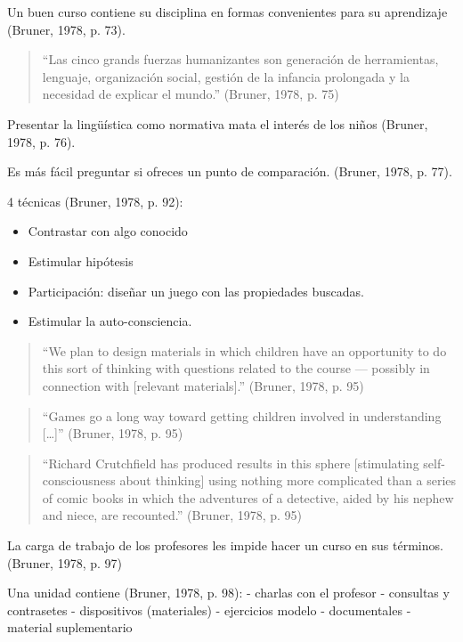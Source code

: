 \documentclass[
  12,
]{scrartcl}
\providecommand{\tightlist}{%
  \setlength{\itemsep}{0pt}\setlength{\parskip}{0pt}}
\begin{document}
Un buen curso contiene su disciplina en formas convenientes para su
aprendizaje (Bruner, 1978, p. 73).

\begin{quote}
``Las cinco grands fuerzas humanizantes son generación de herramientas,
lenguaje, organización social, gestión de la infancia prolongada y la
necesidad de explicar el mundo.'' (Bruner, 1978, p. 75)
\end{quote}

Presentar la lingüística como normativa mata el interés de los niños
(Bruner, 1978, p. 76).

Es más fácil preguntar si ofreces un punto de comparación. (Bruner,
1978, p. 77).

4 técnicas (Bruner, 1978, p. 92):

\begin{itemize}
\tightlist
\item
  Contrastar con algo conocido
\item
  Estimular hipótesis
\item
  Participación: diseñar un juego con las propiedades buscadas.
\item
  Estimular la auto-consciencia.
\end{itemize}

\begin{quote}
``We plan to design materials in which children have an opportunity to
do this sort of thinking with questions related to the course ---
possibly in connection with {[}relevant materials{]}.'' (Bruner, 1978,
p. 95)
\end{quote}

\begin{quote}
``Games go a long way toward getting children involved in understanding
{[}\ldots{]}'' (Bruner, 1978, p. 95)
\end{quote}

\begin{quote}
``Richard Crutchfield has produced results in this sphere {[}stimulating
self-consciousness about thinking{]} using nothing more complicated than
a series of comic books in which the adventures of a detective, aided by
his nephew and niece, are recounted.'' (Bruner, 1978, p. 95)
\end{quote}

La carga de trabajo de los profesores les impide hacer un curso en sus
términos. (Bruner, 1978, p. 97)

Una unidad contiene (Bruner, 1978, p. 98): - charlas con el profesor -
consultas y contrasetes - dispositivos (materiales) - ejercicios modelo
- documentales - material suplementario
\end{document}

